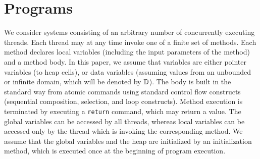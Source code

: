 \section{Programs}
\label{sec:concdata}

We consider systems consisting of an arbitrary number of
concurrently executing threads. Each thread may at any time invoke one of a
finite set of methods.
Each method declares local variables (including
the input parameters of the method) and a method body.
In this paper, we assume that variables are either pointer variables (to heap cells), 
or data variables (assuming values from an unbounded or infinite domain,
which will be denoted by $\mathbb{D}$).
The body is built in the standard way
from atomic commands using standard control
flow constructs (sequential composition, selection, and loop constructs).
Method execution is terminated by executing a {\tt return} command,
which may return a value.
The global variables can be
accessed by all threads, whereas local variables can be accessed only
by the thread which is invoking the corresponding method.
We assume that the global variables and the heap are initialized by
an initialization method, which is executed once at the beginning
of program execution.


